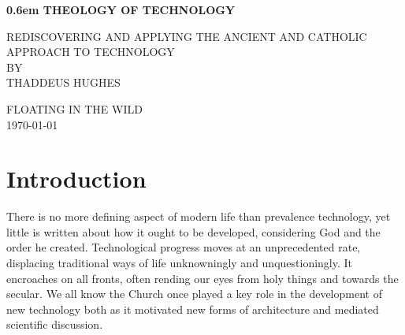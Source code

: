 \documentclass[letterpaper]{article}
\begin{document}
\clearpage
\newcommand\nbvspace[1][3]{\vspace*{\stretch{#1}}}
\newcommand\nbstretchyspace{\spaceskip0.5em plus 0.25em minus 0.25em}
\newcommand{\nbtitlestretch}{\spaceskip0.6em}
\pagestyle{plain}
\begin{center}
  \bfseries
  \nbvspace[1]
  \Huge
  {\nbtitlestretch\huge
    THEOLOGY OF TECHNOLOGY}

  \nbvspace[1]
  \normalsize
  REDISCOVERING AND APPLYING THE ANCIENT AND CATHOLIC APPROACH TO TECHNOLOGY\\

  \nbvspace[1]
  \small BY\\
  \Large THADDEUS HUGHES\\

  \nbvspace[2]

  \nbvspace[3]
  \normalsize

  \large
  FLOATING IN THE WILD \\
  \small \MakeUppercase{\today} \\
\end{center}

\raggedbottom
\tableofcontents

\newpage


\section{Introduction}

There is no more defining aspect of modern life than prevalence technology, yet little is written about how it ought to be developed, considering God and the order he created. Technological progress moves at an unprecedented rate, displacing traditional ways of life unknowningly and unquestioningly. It encroaches on all fronts, often rending our eyes from holy things and towards the secular. We all know the Church once played a key role in the development of new technology both as it motivated new forms of architecture and mediated scientific discussion.
\end{document}
